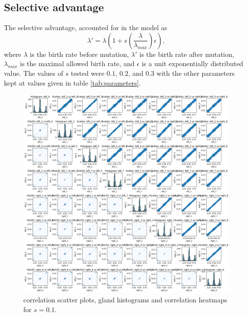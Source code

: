 \subsection{Selective advantage}
The selective advantage, accounted for in the model as
\begin{equation}
    \lambda' = \lambda\left(1 + s\left(\frac{\lambda}{\lambda_{max}}\right)\epsilon\right),
\end{equation}
where $\lambda$ is the birth rate before mutation, $\lambda'$ is the birth rate after mutation, $\lambda_{max}$ is the maximal allowed birth rate, and $\epsilon$ is a unit exponentially distributed value. The values of $s$ tested were $0.1$, $0.2$, and $0.3$ with the other parameters kept at values given in table \ref{tab:parameters}.
\begin{figure}[h]
    \centering
    \includegraphics[width=\textwidth]{Chapter_methylation/figures/sensitivity_selective_advantage1.png}
    \caption{correlation scatter plots, gland histograms and correlation heatmaps for $s=0.1$.}
    \label{fig:sensitivity_selective_advantage1}
\end{figure}
